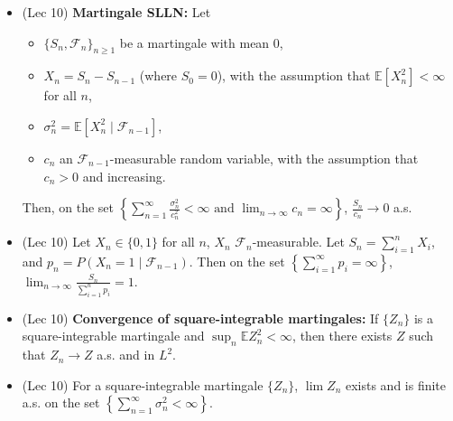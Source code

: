 \documentclass[twoside]{article}
\newcommand{\dis}{\displaystyle}
\newcommand\bbE{\mathbb{E}}
\newcommand\calF{\mathcal{F}}
\newcommand\sg{\sigma}
\begin{document}
\begin{itemize}
\item (Lec 10) \textbf{Martingale SLLN:} Let 
\begin{itemize}
\item $\{ S_n, \calF_n\}_{n \geq 1}$ be a martingale with mean 0, 
\item $X_n = S_n - S_{n-1}$ (where $S_0 = 0$), with the assumption that $\bbE[X_n^2] < \infty$ for all $n$,
\item $\sg_n^2 = \bbE [X_n^2 \mid \calF_{n-1}]$,
\item $c_n$ an $\calF_{n-1}$-measurable random variable, with the assumption that $c_n > 0$ and increasing.
\end{itemize}

Then, on the set $\left\{ \displaystyle\sum_{n= 1}^\infty \frac{\sg_n^2}{c_n^2} < \infty \text{ and } \lim_{n \rightarrow \infty} c_n = \infty \right\}$, $\displaystyle\frac{S_n}{c_n} \rightarrow 0$ a.s.

\item (Lec 10) Let $X_n \in \{0, 1 \}$ for all $n$, $X_n$ $\calF_n$-measurable. Let $S_n = \dis\sum_{i=1}^n X_i$, and $p_n = P (X_n = 1 \mid \calF_{n-1})$. Then on the set $\left\{ \dis\sum_{i=1}^\infty p_i = \infty \right\}$, $\dis\lim_{n \rightarrow \infty} \frac{S_n}{\sum_{i=1}^n p_i} = 1$.

\item (Lec 10) \textbf{Convergence of square-integrable martingales:} If $\{ Z_n \}$ is a square-integrable martingale and $\dis\sup_n \bbE Z_n^2 < \infty$, then there exists $Z$ such that $Z_n \rightarrow Z$ a.s. and in $L^2$.

\item (Lec 10) For a square-integrable martingale $\{ Z_n \}$, $\lim Z_n$ exists and is finite a.s. on the set $\left\{ \displaystyle\sum_{n=1}^\infty \sg_n^2 < \infty \right\}$.


\end{itemize}

\end{document}
